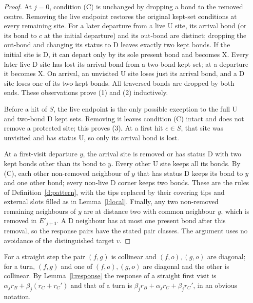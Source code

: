 \begin{proof}
At $j=0$, condition (C) is unchanged by dropping a bond to the
removed centre. Removing the live endpoint restores the original
kept-set conditions at every remaining site. For a later departure
from a live $\mathrm U$ site, its arrival bond (or its bond to $c$
at the initial departure) and its out-bond are distinct; dropping the
out-bond and changing its status to $\mathrm D$ leaves exactly two
kept bonds. If the initial site is $\mathrm D$, it can depart only
by its sole present bond and becomes $\mathrm X$. Every later live
$\mathrm D$ site has lost its arrival bond from a two-bond kept set;
at a departure it becomes $\mathrm X$. On arrival, an unvisited
$\mathrm U$ site loses just its arrival bond, and a $\mathrm D$
site loses one of its two kept bonds. All traversed bonds are dropped
by both ends. These observations prove (1) and (2) inductively.

Before a hit of $S$, the live endpoint is the only possible exception
to the full $\mathrm U$ and two-bond $\mathrm D$ kept sets. Removing
it leaves condition (C) intact and does not remove a protected site;
this proves (3). At a first hit $e\in S$, that site was unvisited
and has status $\mathrm U$, so only its arrival bond is lost.

At a first-visit departure $y$, the arrival site is removed or has
status $\mathrm D$ with two kept bonds other than its bond to $y$.
Every other $\mathrm U$ site keeps all its bonds. By (C), each
other non-removed neighbour of $y$ that has status $\mathrm D$
keeps its bond to $y$ and one other bond; every non-live
$\mathrm D$ corner keeps two bonds. These are the rules of
Definition~\ref{d:pattern}, with the tips replaced by their covering
tips and external slots filled as in Lemma~\ref{l:local}. Finally,
any two non-removed remaining neighbours of $y$ are at distance two
with common neighbour $y$, which is removed in $E'_{j+1}$.
A $\mathrm D$ neighbour has at most one present bond after this
removal, so the response pairs have the stated pair classes.
The argument uses no avoidance of the distinguished target $v$.
\end{proof}

For a straight step the pair $(f, g)$ is collinear and $(f, o), (g, o)$ are diagonal; for a turn, $(f, g)$ and one of $(f, o), (g, o)$ are diagonal and the other is collinear. By Lemma~\ref{l:response} the response of a straight first visit is $\alpha_j r_B + \beta_j(r_C + r_C')$ and that of a turn is $\beta_j r_B + \alpha_j r_C + \beta_j r_C'$, in an obvious notation.

